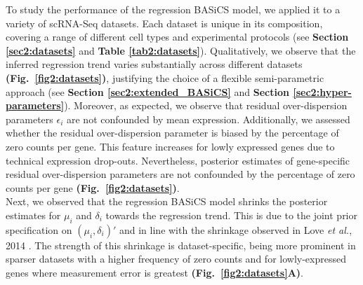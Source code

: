 To study the performance of the regression BASiCS model, we applied it to a variety of scRNA-Seq datasets. Each dataset is unique in its composition, covering a range of different cell types and experimental protocols (see \textbf{Section \ref{sec2:datasets}} and \textbf{Table \ref{tab2:datasets}}). Qualitatively, we observe that the inferred regression trend varies substantially across different datasets \textbf{(Fig.~\ref{fig2:datasets})}, justifying the choice of a flexible semi-parametric approach (see \textbf{Section \ref{sec2:extended_BASiCS}} and \textbf{Section \ref{sec2:hyper-parameters}}). Moreover, as expected, we observe that residual over-dispersion parameters $\epsilon_i$ are not confounded by mean expression. Additionally, we assessed whether the residual over-dispersion parameter is biased by the percentage of zero counts per gene. This feature increases for lowly expressed genes due to technical expression drop-outs. Nevertheless, posterior estimates of gene-specific residual over-dispersion parameters are not confounded by the percentage of zero counts per gene \textbf{(Fig.~\ref{fig2:datasets})}. \\

Next, we observed that the regression BASiCS model shrinks the posterior estimates for $\mu_i$ and $\delta_i$ towards the regression trend. This is due to the joint prior specification on $(\mu_i,\delta_i)'$ and in line with the shrinkage observed in Love \emph{et al.}, 2014 \citep{Love2014}. The strength of this shrinkage is dataset-specific, being more prominent in sparser datasets with a higher frequency of zero counts and for lowly-expressed genes where measurement error is greatest \textbf{(Fig.~\ref{fig2:datasets}A)}. 

\newpage

